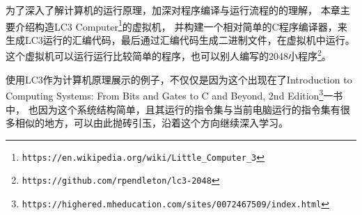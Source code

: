 为了深入了解计算机的运行原理，加深对程序编译与运行流程的的理解，
本章主要介绍构造LC3 Computer\footnote{\nolinkurl{https://en.wikipedia.org/wiki/Little_Computer_3}}的虚拟机，
并构建一个相对简单的C程序编译器，来生成LC3运行的汇编代码，最后通过汇编代码生成二进制文件，在虚拟机中运行。
这个虚拟机可以运行运行比较简单的程序，也可以别人编写的2048小程序\footnote{\nolinkurl{https://github.com/rpendleton/lc3-2048}}。

使用LC3作为计算机原理展示的例子，不仅仅是因为这个出现在了Introduction to Computing Systems: From Bits and Gates to C and Beyond, 2nd Edition\footnote{\nolinkurl{https://highered.mheducation.com/sites/0072467509/index.html}}一书中，
也因为这个系统结构简单，且其运行的指令集与当前电脑运行的指令集有很多相似的地方，可以由此抛砖引玉，沿着这个方向继续深入学习。

